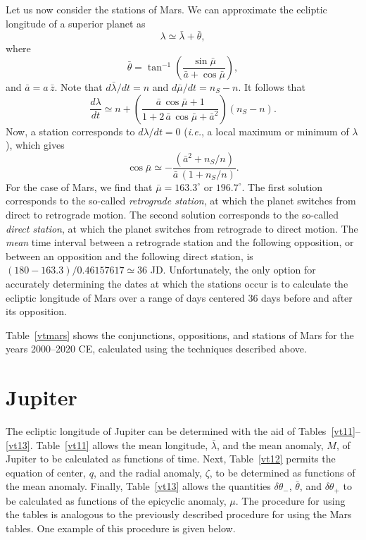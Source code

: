 Let us now consider the stations of Mars. We can approximate the ecliptic longitude of a superior
planet
as
\begin{equation}
\lambda \simeq \bar{\lambda} + \bar{\theta},
\end{equation}
where
\begin{equation}
\bar{\theta} = \tan^{-1}\left(\frac{\sin \bar{\mu}}{\bar{a}+\cos\bar{\mu}}\right),
\end{equation}
and $\bar{a} = a\,\bar{z}$. 
Note that $d\bar{\lambda}/dt= n$ and $d\bar{\mu}/dt = n_S-n$. It follows that
\begin{equation}
\frac{d\lambda}{dt} \simeq n + \left(\frac{\bar{a}\, \cos\bar{\mu}+1}{1+2\,\bar{a}\,\cos\bar{\mu}+\bar{a}^2}\right) (n_S-n).
\end{equation}
Now, a station corresponds to $d\lambda/dt = 0$ ({\em i.e.}, a local maximum or minimum of $\lambda$), which gives
\begin{equation}
\cos\bar{\mu} \simeq - \frac{(\bar{a}^2 + n_S/n)}{\bar{a}\,(1+n_S/n)}.
\end{equation}
For the case of Mars, we find that $\bar{\mu}=163.3^\circ$ or $196.7^\circ$. The first solution corresponds
to the so-called {\em retrograde station}, at which the planet switches from direct to retrograde motion.
The second solution corresponds to the so-called {\em direct station}, at which the planet switches
from retrograde to direct motion. The {\em mean}\/ time interval between a retrograde station and the following
opposition, or between an opposition and the following direct station, is $(180-163.3)/0.46157617\simeq 36$ JD. 
Unfortunately, the only option for accurately determining the  dates at which the stations occur is to calculate
the ecliptic longitude of Mars over a range of days centered 36 days  before and after its opposition.

Table~\ref{vtmars} shows the conjunctions, oppositions, and
stations of Mars for the years 2000--2020 CE, calculated using the
techniques described above.

\section{Jupiter}
The ecliptic longitude of Jupiter can be determined with the aid of Tables~\ref{vt11}--\ref{vt13}. Table~\ref{vt11} allows
the mean longitude, $\bar{\lambda}$, and the mean anomaly, $M$, of Jupiter to be calculated as functions of
time. Next, Table~\ref{vt12} permits the equation of center, $q$, and the radial anomaly, $\zeta$, to
be determined as functions of the mean anomaly. Finally, Table~\ref{vt13} allows the quantities
$\delta\theta_-$, $\bar{\theta}$, and $\delta\theta_+$ to be calculated as functions of the epicyclic
anomaly, $\mu$. 
The procedure for using the tables is analogous to the previously described procedure for
using the Mars tables.
One example of this procedure is given below.

